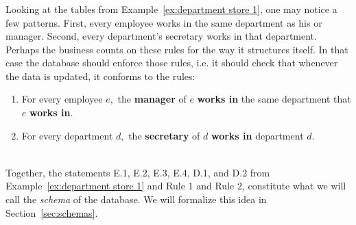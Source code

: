\documentclass[../main/CT4S-EN-RU]{subfiles}
\begin{document}
\begin{exampleRUS}\label{ex:department store 1}
\end{exampleRUS}


\subsubsection{}

\begin{blockENG}
Looking at the tables from Example~\ref{ex:department store 1}, one may notice a few patterns. First, every employee works in the same department as his or manager. Second, every department's secretary works in that department. Perhaps the business counts on these rules for the way it structures itself. In that case the database should enforce those rules, i.e. it should check that whenever the data is updated, it conforms to the rules: 

\begin{enumerate}
\item For every employee $e,$ the {\bf manager} of $e$ {\bf works in} the same department that $e$ {\bf works in}.
\item For every department $d,$ the {\bf secretary} of $d$ {\bf works in} department $d.$
\end{enumerate}
\vspace{-.3in}\begin{align}\label{dia:rules}\end{align}\vspace{-.3in}

Together, the statements E.1, E.2, E.3, E.4, D.1, and D.2 from Example~\ref{ex:department store 1} and Rule 1 and Rule 2, constitute what we will call the {\em schema} of the database. We will formalize this idea in Section~\ref{sec:schemas}.
\end{blockENG}

\begin{blockRUS}
\end{blockRUS}


\subsubsection{}
\end{document}
